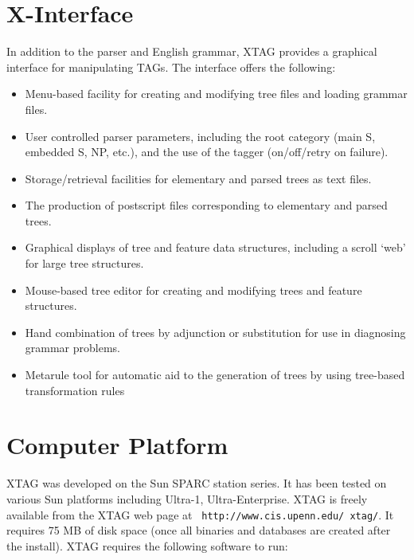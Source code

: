 {\section{X-Interface}

In addition to the parser and English grammar, XTAG provides a graphical
interface for manipulating TAGs.  The interface offers the following:

\begin{itemize}

\item Menu-based facility for creating and modifying tree files and 
loading grammar files.

\item User controlled parser parameters, including the root
category (main S, embedded S, NP, etc.), and the use of the tagger
(on/off/retry on failure).

\item Storage/retrieval facilities for elementary and parsed trees as
text files.

\item The production of postscript files corresponding to elementary
and parsed trees.

\item Graphical displays of tree and feature data structures,
including a scroll `web' for large tree structures.

\item Mouse-based tree editor for creating and modifying trees and
feature structures.

\item Hand combination of trees by adjunction or substitution for use
in diagnosing grammar problems.

\item Metarule tool for automatic aid to the generation of trees by using 
tree-based transformation rules
 
\end{itemize}


\section{Computer Platform}


XTAG was developed on the Sun SPARC station series. It has been tested
on various Sun platforms including Ultra-1, Ultra-Enterprise. XTAG is
freely available from the XTAG web page at {\tt
  http://www.cis.upenn.edu/~xtag/}. It requires 75 MB of disk space
(once all binaries and databases are created after the install). XTAG
requires the following software to run:

}
